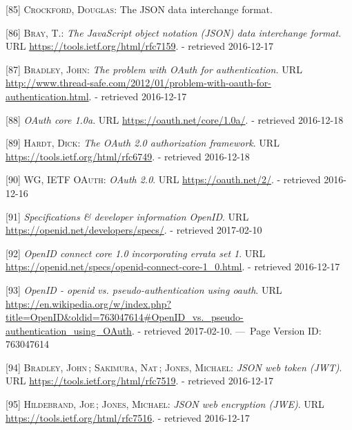 \documentclass[12pt,english,a4paper,titlepage,cleardoublepage=empty,dottedtoc]{report}
\begin{document}
\hypertarget{ref-web_spec_json}{}
{[}85{]} \textsc{Crockford, Douglas}: The JSON data interchange format.

\hypertarget{ref-web_rfc_json}{}
{[}86{]} \textsc{Bray, T.}: \emph{The JavaScript object notation (JSON)
data interchange format}. URL \url{https://tools.ietf.org/html/rfc7159}.
- retrieved 2016-12-17

\hypertarget{ref-web_2012_problem-with-oauth-for-authentication}{}
{[}87{]} \textsc{Bradley, John}: \emph{The problem with OAuth for
authentication.} URL
\url{http://www.thread-safe.com/2012/01/problem-with-oauth-for-authentication.html}.
- retrieved 2016-12-17

\hypertarget{ref-web_spec_oauth-1a}{}
{[}88{]} \emph{OAuth core 1.0a}. URL \url{https://oauth.net/core/1.0a/}.
- retrieved 2016-12-18

\hypertarget{ref-web_spec_oauth-2}{}
{[}89{]} \textsc{Hardt, Dick}: \emph{The OAuth 2.0 authorization
framework}. URL \url{https://tools.ietf.org/html/rfc6749}. - retrieved
2016-12-18

\hypertarget{ref-web_2016_oauth-2}{}
{[}90{]} \textsc{WG, IETF OAuth}: \emph{OAuth 2.0}. URL
\url{https://oauth.net/2/}. - retrieved 2016-12-16

\hypertarget{ref-web_spec_openid-spec-index}{}
{[}91{]} \emph{Specifications \& developer information OpenID}. URL
\url{https://openid.net/developers/specs/}. - retrieved 2017-02-10

\hypertarget{ref-web_spec_openid-connect-1}{}
{[}92{]} \emph{OpenID connect core 1.0 incorporating errata set 1}. URL
\url{https://openid.net/specs/openid-connect-core-1_0.html}. - retrieved
2016-12-17

\hypertarget{ref-web_2017_wikipedia_openid-vs-pseudo-oauth}{}
{[}93{]} \emph{OpenID - openid vs. pseudo-authentication using oauth}.
URL
\url{https://en.wikipedia.org/w/index.php?title=OpenID\&oldid=763047614\#OpenID_vs._pseudo-authentication_using_OAuth}.
- retrieved 2017-02-10. ---~Page Version ID: 763047614

\hypertarget{ref-web_spec_json-web-token}{}
{[}94{]} \textsc{Bradley, John}\,; \textsc{Sakimura, Nat}\,;
\textsc{Jones, Michael}: \emph{JSON web token (JWT)}. URL
\url{https://tools.ietf.org/html/rfc7519}. - retrieved 2016-12-17

\hypertarget{ref-web_spec_json-web-encryption}{}
{[}95{]} \textsc{Hildebrand, Joe}\,; \textsc{Jones, Michael}: \emph{JSON
web encryption (JWE)}. URL \url{https://tools.ietf.org/html/rfc7516}. -
retrieved 2016-12-17
\end{document}
